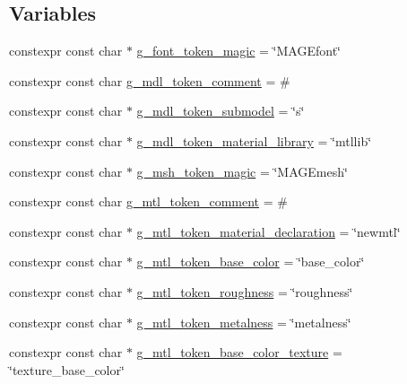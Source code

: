 \subsection*{Variables}
\begin{DoxyCompactItemize}
\item 
constexpr const char $\ast$ \hyperlink{namespacemage_1_1loader_a20d64b38ae4c82f5289faeb28e9e7fad}{g\+\_\+font\+\_\+token\+\_\+magic} = \char`\"{}M\+A\+G\+Efont\char`\"{}
\item 
constexpr const char \hyperlink{namespacemage_1_1loader_aca4ba9456f5233060d09a0f119021168}{g\+\_\+mdl\+\_\+token\+\_\+comment} = \textquotesingle{}\#\textquotesingle{}
\item 
constexpr const char $\ast$ \hyperlink{namespacemage_1_1loader_a435889301ec27f26e73072951e837938}{g\+\_\+mdl\+\_\+token\+\_\+submodel} = \char`\"{}s\char`\"{}
\item 
constexpr const char $\ast$ \hyperlink{namespacemage_1_1loader_a7a130ab03ceb9d2ff5c0c0a64396366e}{g\+\_\+mdl\+\_\+token\+\_\+material\+\_\+library} = \char`\"{}mtllib\char`\"{}
\item 
constexpr const char $\ast$ \hyperlink{namespacemage_1_1loader_a47001903470655feedaec4dbe0d36bb8}{g\+\_\+msh\+\_\+token\+\_\+magic} = \char`\"{}M\+A\+G\+Emesh\char`\"{}
\item 
constexpr const char \hyperlink{namespacemage_1_1loader_a498587a2c902ab61ab36d7251d245cc2}{g\+\_\+mtl\+\_\+token\+\_\+comment} = \textquotesingle{}\#\textquotesingle{}
\item 
constexpr const char $\ast$ \hyperlink{namespacemage_1_1loader_a62a4dc8f5e964317c9a98fcbe46d9168}{g\+\_\+mtl\+\_\+token\+\_\+material\+\_\+declaration} = \char`\"{}newmtl\char`\"{}
\item 
constexpr const char $\ast$ \hyperlink{namespacemage_1_1loader_ac9ab6f0bc81e10d84dd12e8e351e91d6}{g\+\_\+mtl\+\_\+token\+\_\+base\+\_\+color} = \char`\"{}base\+\_\+color\char`\"{}
\item 
constexpr const char $\ast$ \hyperlink{namespacemage_1_1loader_ad803f71d9fcac6672c8ffd56a79fff5a}{g\+\_\+mtl\+\_\+token\+\_\+roughness} = \char`\"{}roughness\char`\"{}
\item 
constexpr const char $\ast$ \hyperlink{namespacemage_1_1loader_ad258922af6fd7f78c5a41e7ab3c47687}{g\+\_\+mtl\+\_\+token\+\_\+metalness} = \char`\"{}metalness\char`\"{}
\item 
constexpr const char $\ast$ \hyperlink{namespacemage_1_1loader_aa5790a41ccac032a029d1610beee41d8}{g\+\_\+mtl\+\_\+token\+\_\+base\+\_\+color\+\_\+texture} = \char`\"{}texture\+\_\+base\+\_\+color\char`\"{}

\end{DoxyCompactItemize}
